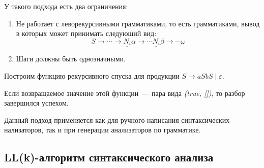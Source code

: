 У такого подхода есть два ограничения:
\begin{enumerate}
  \item Не работает с леворекурсивными грамматиками, то есть грамматиками, вывод в которых может принимать следующий вид:
  \[
  S \to \cdots \to \underline{N_i} \alpha \to \cdots \underline{N_i} \beta \to \cdots \omega
  \]
  \item Шаги должны быть однозначными.
\end{enumerate}

\begin{example}


Построим функцию рекурсивного спуска для продукции $S \rightarrow aSbS \mid \varepsilon$.

\begin{algorithm}


\end{algorithm}
\end{example}

Если возвращаемое значение этой функции~--- пара вида \textit{(true, [])}, то разбор завершился успехом.

Данный подход применяется как для ручного написания синтаксических нализаторов, так и при генерации анализаторов по грамматике.

\subsection{LL(k)-алгоритм синтаксического анализа}

